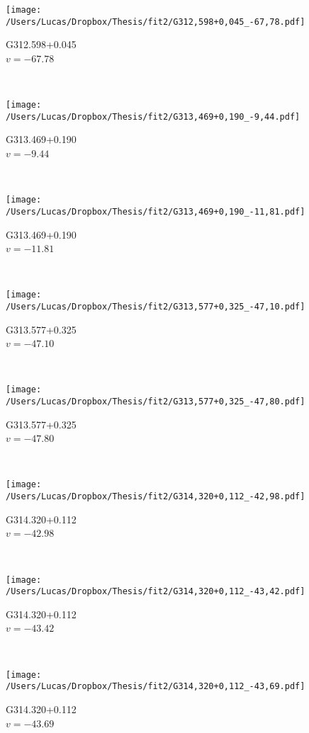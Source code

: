 \begin{figure*}[t]\ContinuedFloat
	\centering
	\begin{subfigure}[t]{0.3\textwidth}
		\texttt{[image: /Users/Lucas/Dropbox/Thesis/fit2/G312,598+0,045\_-67,78.pdf]}
		\caption[]{G312.598+0.045\\$v=-67.78$\,\kms}
	\end{subfigure}
	~
	\begin{subfigure}[t]{0.3\textwidth}
		\texttt{[image: /Users/Lucas/Dropbox/Thesis/fit2/G313,469+0,190\_-9,44.pdf]}
		\caption[]{G313.469+0.190\\$v=-9.44$\,\kms}
	\end{subfigure}
	~
	\begin{subfigure}[t]{0.3\textwidth}
		\texttt{[image: /Users/Lucas/Dropbox/Thesis/fit2/G313,469+0,190\_-11,81.pdf]}
		\caption[]{G313.469+0.190\\$v=-11.81$\,\kms}
	\end{subfigure}
	~
	\begin{subfigure}[t]{0.3\textwidth}
		\texttt{[image: /Users/Lucas/Dropbox/Thesis/fit2/G313,577+0,325\_-47,10.pdf]}
		\caption[]{G313.577+0.325\\$v=-47.10$\,\kms}
	\end{subfigure}
	~
	\begin{subfigure}[t]{0.3\textwidth}
		\texttt{[image: /Users/Lucas/Dropbox/Thesis/fit2/G313,577+0,325\_-47,80.pdf]}
		\caption[]{G313.577+0.325\\$v=-47.80$\,\kms}
	\end{subfigure}
	~
	\begin{subfigure}[t]{0.3\textwidth}
		\texttt{[image: /Users/Lucas/Dropbox/Thesis/fit2/G314,320+0,112\_-42,98.pdf]}
		\caption[]{G314.320+0.112\\$v=-42.98$\,\kms}
	\end{subfigure}
	~
	\begin{subfigure}[t]{0.3\textwidth}
		\texttt{[image: /Users/Lucas/Dropbox/Thesis/fit2/G314,320+0,112\_-43,42.pdf]}
		\caption[]{G314.320+0.112\\$v=-43.42$\,\kms}
	\end{subfigure}
	~
	\begin{subfigure}[t]{0.3\textwidth}
		\texttt{[image: /Users/Lucas/Dropbox/Thesis/fit2/G314,320+0,112\_-43,69.pdf]}
		\caption[]{G314.320+0.112\\$v=-43.69$\,\kms}

\end{subfigure}
\end{figure*}
